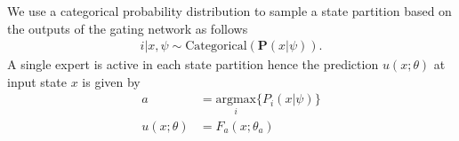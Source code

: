 We use a categorical probability distribution to sample a state partition based
on the outputs of the gating network as follows~\cite{harkonen2022mixtures} 
\begin{align}
  i | x, \psi \sim \text{Categorical}(\mathbf{P}(x| \psi)). 
  \label{eq:gating_categorical}
\end{align}
%
%
A single expert is active in each state partition hence the prediction $u(x;
\theta)$ at input state $x$ is given by 
\begin{align*}
  a &= \underset{i}{\textrm{argmax}} \{ P_i(x | \psi) \}\\
  u(x; \theta) &= F_a(x; \theta_a)
\end{align*}


